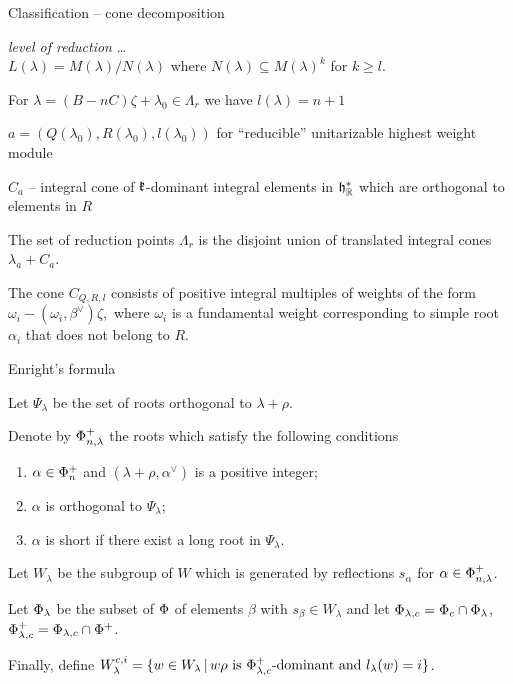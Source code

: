 \documentclass[10pt]{beamer}
\begin{document}
\begin{frame}{Classification -- cone decomposition}

\emph{level of reduction} \ldots \\
$L(\lambda) = M(\lambda) / N(\lambda)$ where $N(\lambda) \subseteq M(\lambda)^k$ for $k\geq l$.

For $\lambda=(B - nC)\zeta + \lambda_0 \in \Lambda_r$ we have $l(\lambda) =n+1$

$a=(Q(\lambda_0), R(\lambda_0), l(\lambda_0))$ for ``reducible'' unitarizable highest weight module

$C_a$  -- integral cone of $\mathfrak{k}$-dominant integral elements in $\mathfrak{h}^*_{\mathbb{R}}$ which are orthogonal to elements in $R$

The set of reduction points $\Lambda_r$ is the disjoint union of translated integral cones $\lambda_a + C_a$.

\begin{lemma}
The cone $C_{Q, R, l}$ consists of positive integral multiples of weights of the form $\omega_i - (\omega_i, \beta^\vee) \zeta,$ where $\omega_i$ is a fundamental weight corresponding to simple root $\alpha_i$ that does not belong to $R$.
\end{lemma}
\end{frame}
%

\begin{frame}{Enright's formula}

\begin{definition}\label{def:cohomology_roots}
Let $\Psi_\lambda$ be the set of roots orthogonal to $\lambda+\rho$.

\pause

 Denote by $\Phi_{n,\lambda}^+$ the roots which satisfy the following conditions
 \begin{enumerate}
    \item $\alpha \in \Phi_n^+$ and $(\lambda+\rho,\alpha^\vee)$ is a positive integer;
    \item $\alpha$ is orthogonal to $\Psi_\lambda$;
    \item $\alpha$ is short if there exist a long root in $\Psi_\lambda$.
 \end{enumerate}

\pause 

 Let $W_\lambda$ be the subgroup of $W$ which is generated by reflections $s_\alpha$ for $\alpha\in \Phi_{n,\lambda}^+$.

\pause 

 Let $\Phi_\lambda$ be the subset of $\Phi$ of elements $\beta$ with $s_\beta\in W_\lambda$ and let $\Phi_{\lambda,c} = \Phi_c \cap \Phi_\lambda$, $\Phi_{\lambda,c}^+ = \Phi_{\lambda,c} \cap \Phi^+$.

\pause 

 Finally, define  $W^{c,i}_\lambda = \{ w \in W_\lambda \, |\, w \rho \text{ is } \Phi^+_{\lambda, c}\text{-dominant and } l_\lambda(w)=i \}$.
\end{definition}

\end{frame}
\end{document}
